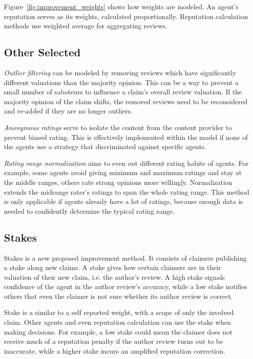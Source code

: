 \documentclass[%
    ]{\PathToTumTemplate/thesis/tum_thesis}
\begin{document}
Figure~\ref{fig:improvement_weights} shows how weights are modeled.
An agent's reputation serves as its weights, calculated proportionally.
Reputation calculation methods use weighted average for aggregating reviews.


\subsection{Other Selected}

\emph{Outlier filtering} can be modeled by removing reviews which have significantly different valuations than the majority opinion.
This can be a way to prevent a small number of saboteurs to influence a claim's overall review valuation.
If the majority opinion of the claim shifts, the removed reviews need to be reconsidered and re-added if they are no longer outliers.

\emph{Anonymous ratings} serve to isolate the content from the content provider to prevent biased rating.
This is effectively implemented within the model if none of the agents use a strategy that discriminated against specific agents.

\emph{Rating range normalization} aims to even out different rating habits of agents.
For example, some agents avoid giving minimum and maximum ratings and stay at the middle ranges, others rate strong opinions more willingly.
Normalization extends the midrange rater's ratings to span the whole rating range.
This method is only applicable if agents already have a lot of ratings, because enough data is needed to confidently determine the typical rating range.


\subsection{Stakes}

Stakes is a new proposed improvement method.
It consists of claimers publishing a stake along new claims.
A stake gives how certain claimers are in their valuation of their new claim, i.e. the author's review.
A high stake signals confidence of the agent in the author review's accuracy, while a low stake notifies others that even the claimer is not sure whether its author review is correct.

Stake is a similar to a self reported weight, with a scope of only the involved claim.
Other agents and even reputation calculation can use the stake when making decisions.
For example, a low stake could mean the claimer does not receive much of a reputation penalty if the author review turns out to be inaccurate, while a higher stake incurs an amplified reputation correction.
\end{document}
